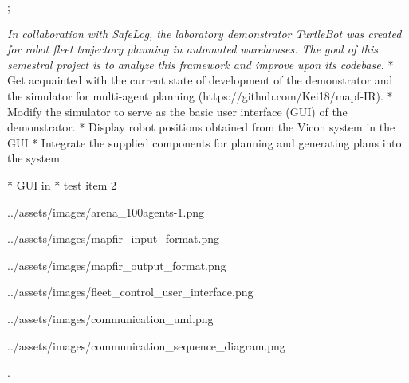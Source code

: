 

\worktype[B/EN]
\slideshow



\pg;


\textit {
    In collaboration with SafeLog, the laboratory demonstrator TurtleBot was created
    for robot fleet trajectory planning in automated warehouses. The goal of this semestral
    project is to analyze this framework and improve upon its codebase.
}
\begitems
* Get acquainted with the current state of development of the demonstrator and the simulator for multi-agent planning (https://github.com/Kei18/mapf-IR).
* Modify the simulator to serve as the basic user interface (GUI) of the demonstrator.
* Display robot positions obtained from the Vicon system in the GUI
* Integrate the supplied components for planning and generating plans into the system.
\enditems
\nl





\begitems
* GUI in 
* test item 2
\enditems
\nl

\centerline{\picw=14cm \inspic ../assets/images/arena_100agents-1.png }


\centerline{\picw=5cm \inspic ../assets/images/mapfir_input_format.png }
\centerline{\picw=5cm \inspic ../assets/images/mapfir_output_format.png }


\centerline{\picw=5cm \inspic ../assets/images/fleet_control_user_interface.png }


\centerline{\picw=5cm \inspic ../assets/images/communication_uml.png}


\centerline{\picw=5cm \inspic ../assets/images/communication_sequence_diagram.png}


\pg.